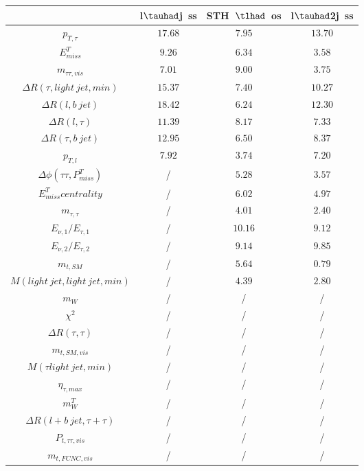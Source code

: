 \centering
\begin{tabular}{|c|c|c|c|} \hline
 & l$\tauhad$j~ss & STH~$\tlhad$~os & l$\tauhad$2j~ss\\\hline
$p_{T,\tau }$ & $17.68$ & $7.95$ & $13.70$\\\hline
$E^{T}_{miss}$ & $9.26$ & $6.34$ & $3.58$\\\hline
$m_{\tau \tau ,vis}$ & $7.01$ & $9.00$ & $3.75$\\\hline
$\Delta R(\tau ,light~jet,min)$ & $15.37$ & $7.40$ & $10.27$\\\hline
$\Delta R(l,b~jet)$ & $18.42$ & $6.24$ & $12.30$\\\hline
$\Delta R(l,\tau )$ & $11.39$ & $8.17$ & $7.33$\\\hline
$\Delta R(\tau ,b~jet)$ & $12.95$ & $6.50$ & $8.37$\\\hline
$p_{T,l}$ & $7.92$ & $3.74$ & $7.20$\\\hline
$\Delta\phi(\tau \tau ,P^{T}_{miss})$ &  / & $5.28$ & $3.57$\\\hline
$E^{T}_{miss} centrality$ &  / & $6.02$ & $4.97$\\\hline
$m_{\tau ,\tau }$ &  / & $4.01$ & $2.40$\\\hline
$E_{\nu,1}/E_{\tau ,1}$ &  / & $10.16$ & $9.12$\\\hline
$E_{\nu,2}/E_{\tau ,2}$ &  / & $9.14$ & $9.85$\\\hline
$m_{t,SM}$ &  / & $5.64$ & $0.79$\\\hline
$M(light~jet,light~jet,min)$ &  / & $4.39$ & $2.80$\\\hline
$m_{W}$ &  / &  / &  /\\\hline
$\chi^{2}$ &  / &  / &  /\\\hline
$\Delta R(\tau ,\tau )$ &  / &  / &  /\\\hline
$m_{t,SM,vis}$ &  / &  / &  /\\\hline
$M(\tau  light~jet,min)$ &  / &  / &  /\\\hline
$\eta_{\tau ,max}$ &  / &  / &  /\\\hline
$m^{T}_{W}$ &  / &  / &  /\\\hline
$\Delta R(l+b~jet,\tau +\tau )$ &  / &  / &  /\\\hline
$P_{t,\tau \tau ,vis}$ &  / &  / &  /\\\hline
$m_{t,FCNC,vis}$ &  / &  / &  /\\\hline
\end{tabular}
